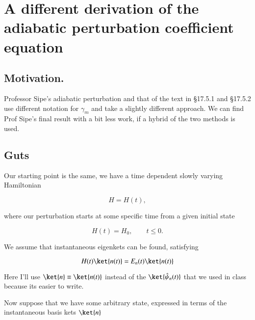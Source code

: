 %
%

\chapter{A different derivation of the adiabatic perturbation coefficient equation}
\label{chap:adiabaticPertTakeII}
{}
\date{Oct 27, 2011}

\beginArtWithToc

\section{Motivation.}

Professor Sipe's adiabatic perturbation and that of the text \cite{desai2009quantum} in \S 17.5.1 and \S 17.5.2 use different notation for $\gamma_m$ and take a slightly different approach.  We can find Prof Sipe's final result with a bit less work, if a hybrid of the two methods is used.

\section{Guts}

Our starting point is the same, we have a time dependent slowly varying Hamiltonian 

\begin{equation}\label{eqn:adiabaticPertTakeII:10}
H = H(t),
\end{equation}

where our perturbation starts at some specific time from a given initial state

\begin{equation}\label{eqn:adiabaticPertTakeII:30}
H(t) = H_0, \qquad t \le 0.
\end{equation}

We assume that instantaneous eigenkets can be found, satisfying

\begin{equation}\label{eqn:adiabaticPertTakeII:50}
H(t) \ket{n(t)} = E_n(t) \ket{n(t)}
\end{equation}

Here I'll use $\ket{n} \equiv \ket{n(t)}$ instead of the $\ket{\hat{\psi}_n(t)}$ that we used in class because its easier to write.

Now suppose that we have some arbitrary state, expressed in terms of the instantaneous basis kets $\ket{n}$

